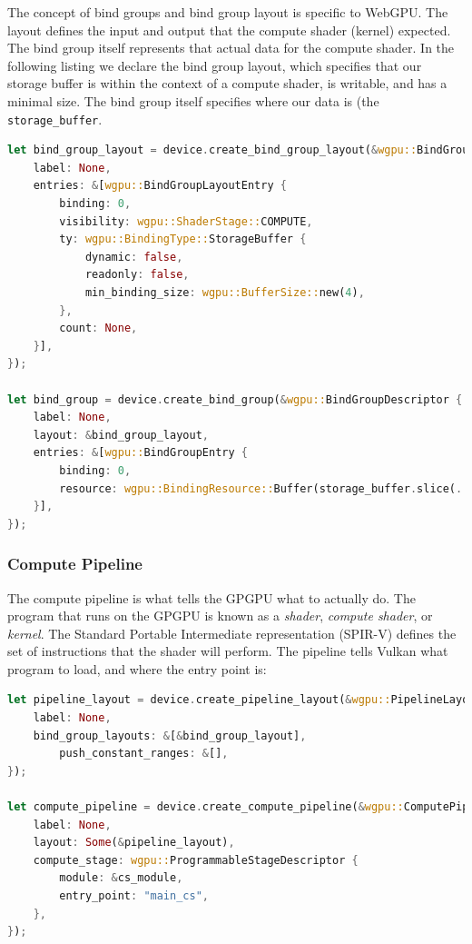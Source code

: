 \documentclass{article}
\begin{document}
The concept of bind groups and bind group layout is specific to WebGPU. The layout defines the input and output that the compute shader (kernel) expected. The bind group itself represents that actual data for the compute shader. In the following listing we declare the bind group layout, which specifies that our storage buffer is within the context of a compute shader, is writable, and has a minimal size. The bind group itself specifies where our data is (the \texttt{storage\_buffer}.

\begin{lstlisting}[language=Rust, style=boxed]
let bind_group_layout = device.create_bind_group_layout(&wgpu::BindGroupLayoutDescriptor {
    label: None,
    entries: &[wgpu::BindGroupLayoutEntry {
        binding: 0,
        visibility: wgpu::ShaderStage::COMPUTE,
        ty: wgpu::BindingType::StorageBuffer {
            dynamic: false,
            readonly: false,
            min_binding_size: wgpu::BufferSize::new(4),
        },
        count: None,
    }],
});

let bind_group = device.create_bind_group(&wgpu::BindGroupDescriptor {
    label: None,
    layout: &bind_group_layout,
    entries: &[wgpu::BindGroupEntry {
        binding: 0,
        resource: wgpu::BindingResource::Buffer(storage_buffer.slice(..)),
    }],
});
\end{lstlisting}


\subsubsection{Compute Pipeline}

The compute pipeline is what tells the GPGPU what to actually do. The program that runs on the GPGPU is known as a \textit{shader}, \textit{compute shader}, or \textit{kernel}. The Standard Portable Intermediate representation (SPIR-V) defines the set of instructions that the shader will perform. The pipeline tells Vulkan what program to load, and where the entry point is:

\begin{lstlisting}[language=Rust, style=boxed]
let pipeline_layout = device.create_pipeline_layout(&wgpu::PipelineLayoutDescriptor {
    label: None,
    bind_group_layouts: &[&bind_group_layout],
        push_constant_ranges: &[],
});

let compute_pipeline = device.create_compute_pipeline(&wgpu::ComputePipelineDescriptor {
    label: None,
    layout: Some(&pipeline_layout),
    compute_stage: wgpu::ProgrammableStageDescriptor {
        module: &cs_module,
        entry_point: "main_cs",
    },
});
\end{lstlisting}
\end{document}
